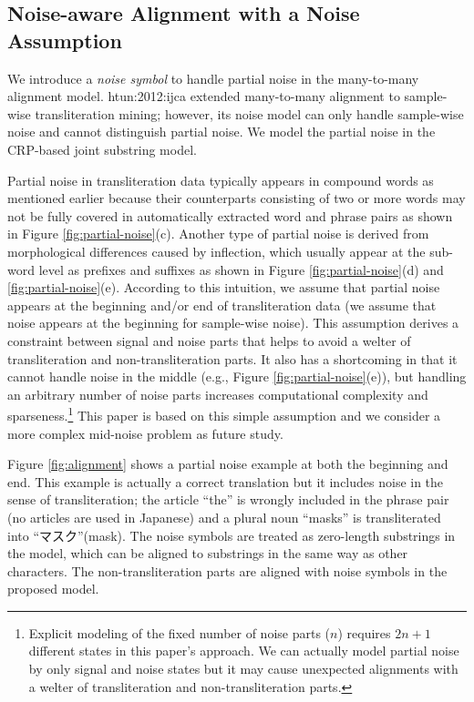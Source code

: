 \documentclass[english]{jnlp_1.4}
\makeatletter
\def\@{}
\newcommand{\newcite}{}
\makeatother
\begin{document}
\subsection{Noise-aware Alignment with a Noise Assumption}

We introduce a {\em noise symbol} to handle partial noise in the many-to-many alignment model.
\newcite{htun:2012:ijca} extended many-to-many alignment to sample-wise transliteration mining;
however, its noise model can only handle sample-wise noise and cannot distinguish partial noise.
We model the partial noise in the CRP-based joint substring model.

Partial noise in transliteration data typically appears in compound words as mentioned earlier
because their counterparts consisting of two or more words
\pagebreak
may not be fully covered in automatically extracted word and phrase pairs as shown in Figure \ref{fig:partial-noise}(c).
Another type of partial noise is derived from morphological differences caused by inflection,
which usually appear at the sub-word level as prefixes and suffixes
as shown in Figure \ref{fig:partial-noise}(d) and {\ref{fig:partial-noise}}(e).
According to this intuition,
we assume that partial noise appears at the beginning and/or end of transliteration data
(we assume that noise appears at the beginning for sample-wise noise).
This assumption derives a constraint between signal and noise parts
that helps to avoid a welter of transliteration and non-transliteration parts.
It also has a shortcoming in that it cannot handle noise in the middle (e.g., Figure \ref{fig:partial-noise}(e)),
but handling an arbitrary number of noise parts increases computational complexity and sparseness.\footnote{
Explicit modeling of the fixed number of noise parts ($n$) requires $2n+1$ different states in this paper's approach.
We can actually model partial noise by only signal and noise states
but it may cause unexpected alignments with a welter of transliteration and non-transliteration parts.}\@ 
This paper is based on this simple assumption and we consider a more complex mid-noise problem as future study.

Figure \ref{fig:alignment} shows a partial noise example at both the beginning and end.
This example is actually a correct translation but it includes noise in the sense of transliteration;
the article ``the'' is wrongly included in the phrase pair (no articles are used in Japanese)
and a plural noun ``masks'' is transliterated into ``{マスク}''(mask).
The noise symbols are treated as zero-length substrings in the model,
which can be aligned to substrings in the same way as other characters.
The non-transliteration parts are aligned with noise symbols in the proposed model.
\end{document}
